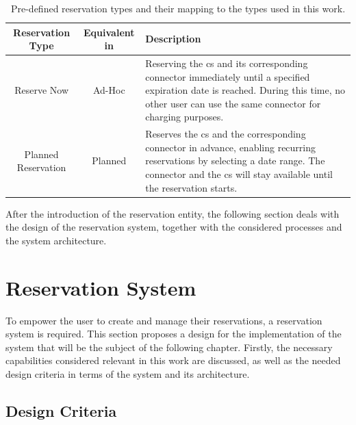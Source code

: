 \begingroup
\setlength{\tabcolsep}{10pt} %
\renewcommand{\arraystretch}{1.5} %
\begin{table}[h]
    \centering
    \caption{Pre-defined reservation types and their mapping to the types used in this work.}
    \begin{tabular}{c|c|m{6.5cm}}
        Reservation Type & Equivalent in \cite{basmadjian_interoperable_2019,basmadjian_reference_2020} & Description \\ \hline
        Reserve Now & Ad-Hoc &Reserving the \acrshort{cs} and its corresponding connector immediately until a specified expiration date is reached. During this time, no other user can use the same connector for charging purposes. \\
        Planned Reservation & Planned & Reserves the \acrshort{cs} and the corresponding connector in advance, enabling recurring reservations by selecting a date range. The connector and the \acrshort{cs} will stay available until the reservation starts.
    \end{tabular}
    \label{tab:reservation-types}
\end{table}
\endgroup

After the introduction of the reservation entity, the following section deals with the design of the reservation system, together with the considered processes and the system architecture. 

\newpage

\section{Reservation System}
\label{ch:Design:sec:Reservation System}

To empower the user to create and manage their reservations, a reservation system is required. This section proposes a design for the implementation of the system that will be the subject of the following chapter. Firstly, the necessary capabilities considered relevant in this work are discussed, as well as the needed design criteria in terms of the system and its architecture.

\subsection{Design Criteria}
\label{ch:Design:sec:Reservation System:ssec:Design Criteria}

